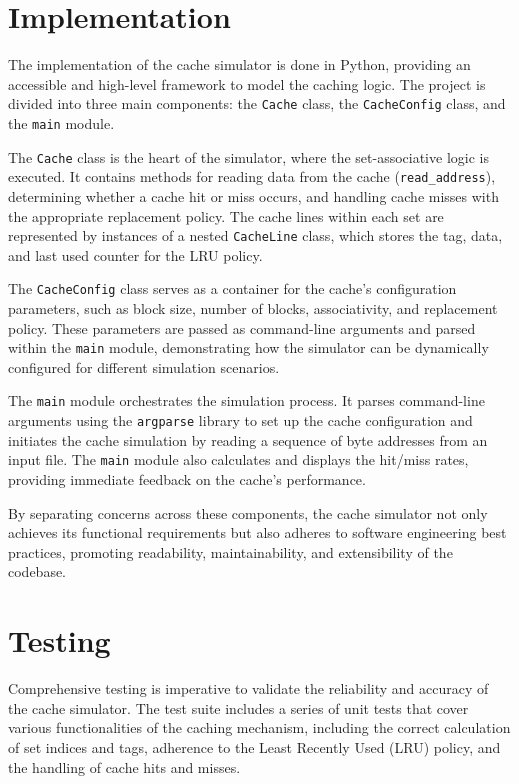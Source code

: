 \documentclass[12pt]{article}
\begin{document}
\section{Implementation}

The implementation of the cache simulator is done in Python, providing an accessible and high-level framework to model the caching logic. The project is divided into three main components: the \texttt{Cache} class, the \texttt{CacheConfig} class, and the \texttt{main} module.

The \texttt{Cache} class is the heart of the simulator, where the set-associative logic is executed. It contains methods for reading data from the cache (\texttt{read\_address}), determining whether a cache hit or miss occurs, and handling cache misses with the appropriate replacement policy. The cache lines within each set are represented by instances of a nested \texttt{CacheLine} class, which stores the tag, data, and last used counter for the LRU policy.

The \texttt{CacheConfig} class serves as a container for the cache's configuration parameters, such as block size, number of blocks, associativity, and replacement policy. These parameters are passed as command-line arguments and parsed within the \texttt{main} module, demonstrating how the simulator can be dynamically configured for different simulation scenarios.

The \texttt{main} module orchestrates the simulation process. It parses command-line arguments using the \texttt{argparse} library to set up the cache configuration and initiates the cache simulation by reading a sequence of byte addresses from an input file. The \texttt{main} module also calculates and displays the hit/miss rates, providing immediate feedback on the cache's performance.

By separating concerns across these components, the cache simulator not only achieves its functional requirements but also adheres to software engineering best practices, promoting readability, maintainability, and extensibility of the codebase.

\section{Testing}

Comprehensive testing is imperative to validate the reliability and accuracy of the cache simulator. The test suite includes a series of unit tests that cover various functionalities of the caching mechanism, including the correct calculation of set indices and tags, adherence to the Least Recently Used (LRU) policy, and the handling of cache hits and misses.
\end{document}

